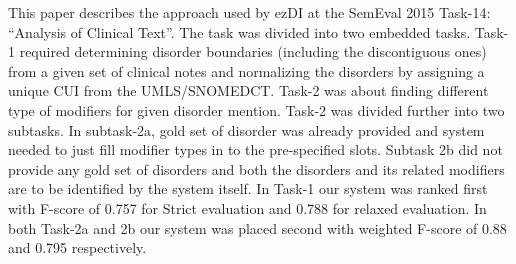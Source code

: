 This paper describes the approach used by ezDI at the SemEval 2015 Task-14: ``Analysis of Clinical Text''. The task was divided into two embedded tasks. Task-1 required determining disorder boundaries (including the discontiguous ones) from a given set of clinical notes and normalizing the disorders by assigning a unique CUI from the UMLS/SNOMEDCT. Task-2 was about finding different type of modifiers for given disorder mention. Task-2 was divided further into two subtasks. In subtask-2a, gold set of disorder was already provided and system needed to just fill modifier types in to the pre-specified slots. Subtask 2b did not provide any gold set of disorders and both the disorders and its related modifiers are to be identified by the system itself. In Task-1 our system was ranked first with F-score of 0.757 for Strict evaluation and 0.788 for relaxed evaluation. In both Task-2a and 2b our system was placed second with weighted F-score of 0.88 and 0.795 respectively.
